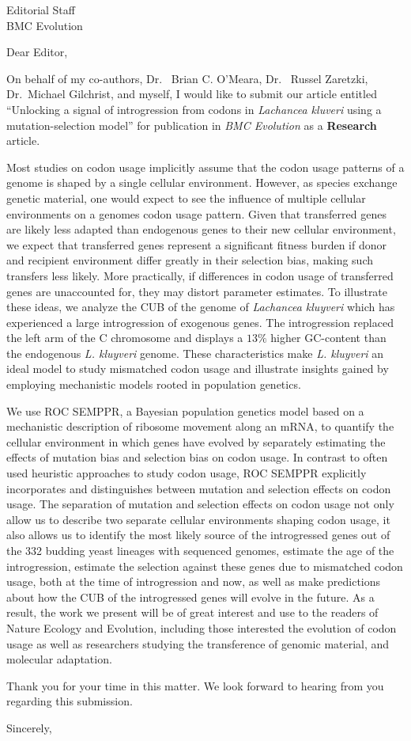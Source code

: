 \documentclass[11pt, letterpaper]{letter}
\begin{document}
\begin{letter}{Editorial Staff\\BMC Evolution}



\opening{Dear Editor,}

On behalf of my co-authors, Dr.~ Brian C. O'Meara, Dr.~ Russel Zaretzki, Dr.~Michael Gilchrist, and myself, I would like to submit our article entitled ``Unlocking a signal of introgression from codons in \textit{Lachancea kluveri} using a mutation-selection model'' for publication in \emph{BMC Evolution} as a \textbf{Research} article. 

Most studies on codon usage implicitly assume that the codon usage patterns of a genome is shaped by a single cellular environment. 
However, as species exchange genetic material, one would expect to see the influence of multiple cellular environments on a genomes codon usage pattern.
Given that transferred genes are likely less adapted than endogenous genes to their new cellular environment, we expect that transferred genes represent a significant fitness burden if donor and recipient environment differ greatly in their selection bias, making such transfers less likely.
More practically, if differences in codon usage of transferred genes are unaccounted for, they may distort parameter estimates.
To illustrate these ideas, we analyze the CUB of the genome of \emph{Lachancea kluyveri} which has experienced a large introgression of exogenous genes.
The introgression replaced the left arm of the C chromosome and displays a $13 \%$ higher GC-content than the endogenous \emph{L. kluyveri} genome.
These characteristics make \emph{L. kluyveri} an ideal model to study mismatched codon usage and illustrate insights gained by employing mechanistic models rooted in population genetics.

We use ROC SEMPPR, a Bayesian population genetics model based on a mechanistic description of ribosome movement along an mRNA, to quantify the cellular environment in which genes have evolved by separately estimating the effects of mutation bias and selection bias on codon usage.
In contrast to often used heuristic approaches to study codon usage, ROC SEMPPR explicitly incorporates and distinguishes between mutation and selection effects on codon usage.
The separation of mutation and selection effects on codon usage not only allow us to describe two separate cellular environments shaping codon usage, it also allows us to identify the most likely source of the introgressed genes out of the 332 budding yeast lineages with sequenced genomes, estimate the age of the introgression, estimate the selection against these genes due to mismatched codon usage, both at the time of introgression and now, as well as make predictions about how the CUB of the introgressed genes will evolve in the future.
As a result, the work we present will be of great interest and use to the readers of Nature Ecology and Evolution, including those interested the evolution of codon usage as well as researchers studying the transference of genomic material, and molecular adaptation.

Thank you for your time in this matter.
We look forward to hearing from you regarding this submission.

\closing{Sincerely,}

\end{letter}
\end{document}

